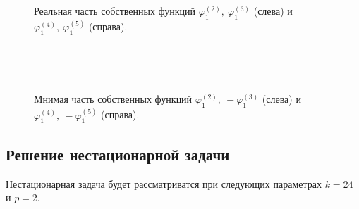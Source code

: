 \begin{figure}[H]
  \begin{center}
\begin{minipage}{0.49\linewidth}
 \\
\end{minipage}
\hfill
\begin{minipage}{0.49\linewidth}
 \\
\end{minipage}
\caption{Реальная часть собственных функций $\varphi^{(2)}_1, \ \varphi^{(3)}_1$ (слева) и $\varphi^{(4)}_1, \ \varphi^{(5)}_1$ (справа).}
\label{fig:s2}
  \end{center}
\end{figure}

\begin{figure}[H]
  \begin{center}
\begin{minipage}{0.49\linewidth}
 \\
\end{minipage}
\hfill
\begin{minipage}{0.49\linewidth}
 \\
\end{minipage}
\caption{Мнимая часть собственных функций $\varphi^{(2)}_1, \ - \varphi^{(3)}_1$ (слева) и $\varphi^{(4)}_1, \ - \varphi^{(5)}_1$ (справа).}
\label{fig:s3}
  \end{center}
\end{figure}

\subsection{Решение нестационарной задачи}
Нестационарная задача будет рассматриватся при следующих параметрах $k=24$ и $p=2$.

